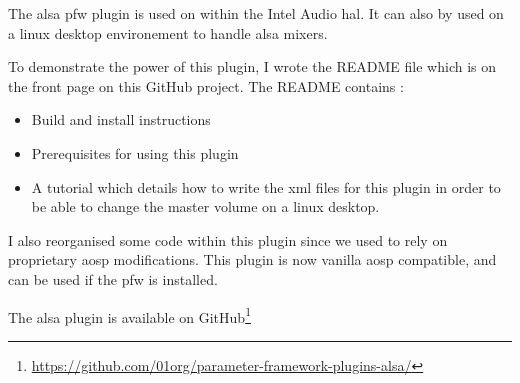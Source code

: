 The \gls{alsa} \gls{pfw} plugin is used on within the Intel Audio \gls{hal}. It can also by used
on a linux desktop environement to handle \gls{alsa} mixers.

To demonstrate the power of this plugin, I wrote the README file which is on the
front page on this \gls{GitHub} project.  The README contains :
\begin{itemize}
    \item Build and install instructions
    \item Prerequisites for using this plugin
    \item A tutorial which details how to write the \gls{xml} files for this
    plugin in order to be able to change the master volume on a linux desktop.
\end{itemize}
I also reorganised some code within this plugin since we used to rely on proprietary \gls{aosp} modifications.
This plugin is now vanilla \gls{aosp} compatible, and can be used if the \gls{pfw} is installed.

The \gls{alsa} plugin is available on \gls{GitHub}\footnote{\url{https://github.com/01org/parameter-framework-plugins-alsa/}}
